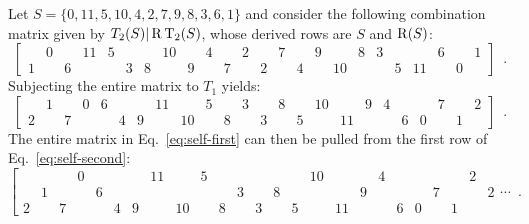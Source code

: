 \begin{example}
    \cite[221]{Starr1984}
    \label{self-folded}
    Let $S = \{ 0, 11, 5, 10, 4, 2, 7, 9, 8, 3, 6, 1 \}$ and consider the following combination matrix given by $T_2(S) | \operatorname{R}\operatorname{T}_2(S)$, whose derived rows are $S$ and $\operatorname{R}(S)$:
    \begin{equation}
        \label{eq:self-first}
        \left[
        \begin{array}{cccccccccccc|cccccccccccc}
            & 0 && 11 & 5 &&& 10 && 4 && 2 && 7 && 9 && 8 & 3 &&& 6 && 1 \\
            1 && 6 &&& 3 & 8 && 9 && 7 && 2 && 4 && 10 &&& 5 & 11 && 0 &
        \end{array}
        \right] \enspace.
    \end{equation}
    Subjecting the entire matrix to $T_1$ yields:
    \begin{equation}
        \label{eq:self-second}
        \left[
        \begin{array}{cccccccccccc|cccccccccccc}
            & 1 && 0 & 6 &&& 11 && 5 && 3 && 8 && 10 && 9 & 4 &&& 7 && 2 \\
            2 && 7 &&& 4 & 9 && 10 && 8 && 3 && 5 && 11 &&& 6 & 0 && 1 &
        \end{array}
        \right] \enspace.
    \end{equation}
    The entire matrix in Eq.~\ref{eq:self-first} can then be pulled from the first row of Eq.~\ref{eq:self-second}:
    \begin{equation}
        \left[
        \begin{array}{cccccccccccc|cccccccccccc|c}
            &&& 0 &&&& 11 && 5 &&&&&& 10 &&& 4 &&&&& 2 & \\
            & 1 &&& 6 &&&&&&& 3 && 8 &&&& 9 &&&& 7 &&& 2 \\
            2 && 7 &&& 4 & 9 && 10 && 8 && 3 && 5 && 11 &&& 6 & 0 && 1 &&
        \end{array}
        \cdots \right. \enspace.
    \end{equation}
\end{example}

